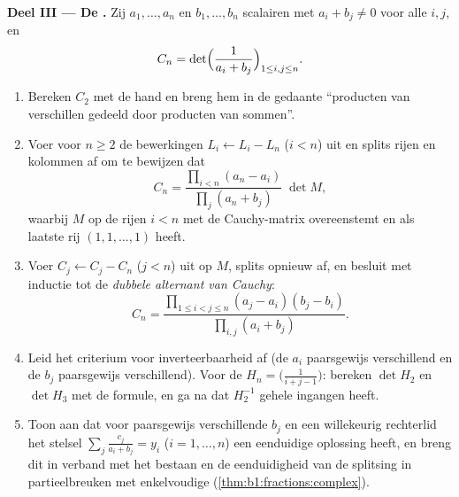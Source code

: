 \begin{problem}
\medskip
\noindent\textbf{Deel III --- De .} Zij $a_1,
\dots, a_n$ en $b_1, \dots, b_n$ scalairen met $a_i + b_j \neq 0$
voor alle $i, j$, en
\[
C_n = \det\Bigl(\frac{1}{a_i + b_j}\Bigr)_{1 \leq i, j \leq n} .
\]
\begin{enumerate}[resume]
  \item Bereken $C_2$ met de hand en breng hem in de gedaante
        ``producten van verschillen gedeeld door producten van
        sommen''.
  \item Voer voor $n \geq 2$ de bewerkingen $L_i \leftarrow L_i -
        L_n$ ($i < n$) uit en splits rijen en kolommen af om te
        bewijzen dat
        \[
        C_n = \frac{\prod_{i<n}(a_n - a_i)}{\prod_{j}(a_n +
        b_j)}\;\det M,
        \]
        waarbij $M$ op de rijen $i < n$ met de Cauchy-matrix
        overeenstemt en als laatste rij $(1, 1, \dots, 1)$ heeft.
  \item Voer $C_j \leftarrow C_j - C_n$ ($j < n$) uit op $M$,
        splits opnieuw af, en besluit met inductie tot de
        \emph{dubbele alternant van Cauchy}:
        \[
        C_n = \frac{\prod_{1 \leq i < j \leq n}(a_j - a_i)(b_j -
        b_i)}{\prod_{i, j}(a_i + b_j)} .
        \]
  \item Leid het criterium voor inverteerbaarheid af (de $a_i$
        paarsgewijs verschillend en de $b_j$ paarsgewijs
        verschillend). Voor de \emph{} $H_n =
        \bigl(\frac{1}{i + j - 1}\bigr)$: bereken $\det H_2$ en
        $\det H_3$ met de formule, en ga na dat $H_2^{-1}$ gehele
        ingangen heeft.
  \item Toon aan dat voor paarsgewijs verschillende $b_j$ en een
        willekeurig rechterlid het stelsel $\sum_j \frac{c_j}{a_i +
        b_j} = y_i$ ($i = 1, \dots, n$) een eenduidige oplossing
        heeft, en breng dit in verband met het bestaan en de
        eenduidigheid van de splitsing in partieelbreuken met
        enkelvoudige  (\cref{thm:b1:fractions:complex}).
\end{enumerate}


\end{problem}
